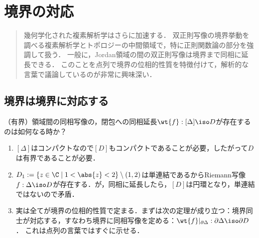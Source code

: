 \documentclass[uplatex, dvipdfmx]{jsreport}
\begin{document}
\chapter{境界の対応}

\begin{quotation}
    幾何学化された複素解析学はさらに加速する．
    双正則写像の境界挙動を調べる複素解析学とトポロジーの中間領域で，特に正則関数論の部分を強調して扱う．
    一般に，Jordan領域の間の双正則写像は境界まで同相に延長できる．
    このことを点列で境界の位相的性質を特徴付けて，解析的な言葉で議論しているのが非常に興味深い．
\end{quotation}

\section{境界は境界に対応する}

\begin{tcolorbox}[colframe=ForestGreen, colback=ForestGreen!10!white,breakable,colbacktitle=ForestGreen!40!white,coltitle=black,fonttitle=\bfseries\sffamily,
title=]
    （有界）領域間の同相写像の，閉包への同相延長$\wt{f}:[\Delta]\iso D$が存在するのは如何なる時か？
    \begin{enumerate}
        \item $[\Delta]$はコンパクトなので$[D]$もコンパクトであることが必要，したがって$D$は有界であることが必要．
        \item $D_1:=\{z\in\C\mid 1<\abs{z}<2\}\setminus(1,2)$は単連結であるからRiemann写像$f:\Delta\iso D$が存在する．が，同相に延長したら，$[D]$は円環となり，単連結ではないので矛盾．
        \item 実は全てが境界の位相的性質で定まる．まずは次の定理が成り立つ：境界同士が対応する，すなわち境界に同相写像を定める：$\wt{f}|_{\partial\Delta}:\partial\Delta\iso\partial D$．
        これは点列の言葉ではすぐに示せる．
    \end{enumerate}
\end{tcolorbox}
\end{document}
